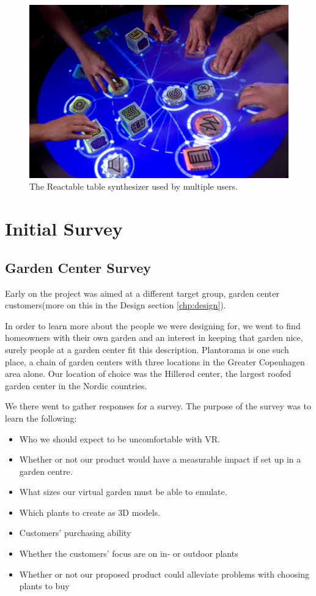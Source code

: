 				\begin{figure}[H]
					\centering
					\includegraphics[width=0.6\linewidth]{figure/Analysis/reactable}
					\caption{The Reactable table synthesizer used by multiple users.}
					\label{fig:reactable}
				\end{figure} 
		
		
			\section{Initial Survey}\label{sec:initialSurvey}
			
			\subsection{Garden Center Survey}
			Early on the project was aimed at a different target group, garden center customers(more on this in the Design section \ref{chp:design}).

			In order to learn more about the people we were designing for, we went to find homeowners with their own garden and an interest in keeping that garden nice, surely people at a garden center fit this description. Plantorama is one such place, a chain of garden centers with three locations in the Greater Copenhagen area alone. Our location of choice was the Hillerød center, the largest roofed garden center in the Nordic countries. 
			
			We there went to gather responses for a survey. 
			The purpose of the survey was to learn the following:
			
			\begin{itemize}
				\item Who we should expect to be uncomfortable with VR.
				\item Whether or not our product would have a measurable impact if set up in a garden centre.
				\item What sizes our virtual garden must be able to emulate.
				\item Which plants to create as 3D models.
				\item Customers' purchasing ability
				\item Whether the customers' focus are on in- or outdoor plants
				\item Whether or not our proposed product could alleviate problems with choosing plants to buy
			\end{itemize}
